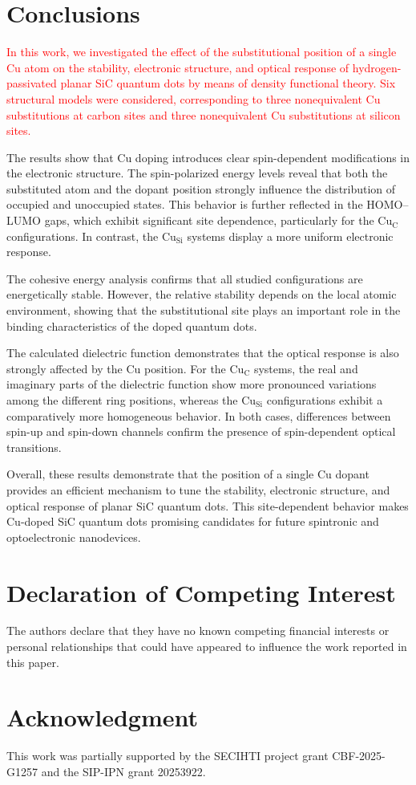 \documentclass[11pt]{article} %
\begin{document}
\section{Conclusions}


\textcolor{red}{In this work, we investigated the effect of the substitutional position of a single Cu atom on the stability, electronic structure, and optical response of hydrogen-passivated planar SiC quantum dots by means of density functional theory. Six structural models were considered, corresponding to three nonequivalent Cu substitutions at carbon sites and three nonequivalent Cu substitutions at silicon sites.}

The results show that Cu doping introduces clear spin-dependent modifications in the electronic structure. The spin-polarized energy levels reveal that both the substituted atom and the dopant position strongly influence the distribution of occupied and unoccupied states. This behavior is further reflected in the HOMO--LUMO gaps, which exhibit significant site dependence, particularly for the $\mathrm{Cu_C}$ configurations. In contrast, the $\mathrm{Cu_{Si}}$ systems display a more uniform electronic response.

The cohesive energy analysis confirms that all studied configurations are energetically stable. However, the relative stability depends on the local atomic environment, showing that the substitutional site plays an important role in the binding characteristics of the doped quantum dots.

The calculated dielectric function demonstrates that the optical response is also strongly affected by the Cu position. For the $\mathrm{Cu_C}$ systems, the real and imaginary parts of the dielectric function show more pronounced variations among the different ring positions, whereas the $\mathrm{Cu_{Si}}$ configurations exhibit a comparatively more homogeneous behavior. In both cases, differences between spin-up and spin-down channels confirm the presence of spin-dependent optical transitions.

Overall, these results demonstrate that the position of a single Cu dopant provides an efficient mechanism to tune the stability, electronic structure, and optical response of planar SiC quantum dots. This site-dependent behavior makes Cu-doped SiC quantum dots promising candidates for future spintronic and optoelectronic nanodevices.

\section*{Declaration of Competing Interest}

The authors declare that they have no known competing financial interests or personal relationships that could have appeared to influence the work reported in this paper.

\section*{Acknowledgment}

This work was partially supported by the SECIHTI project grant CBF-2025-G1257 and the SIP-IPN grant 20253922.


\end{document}
